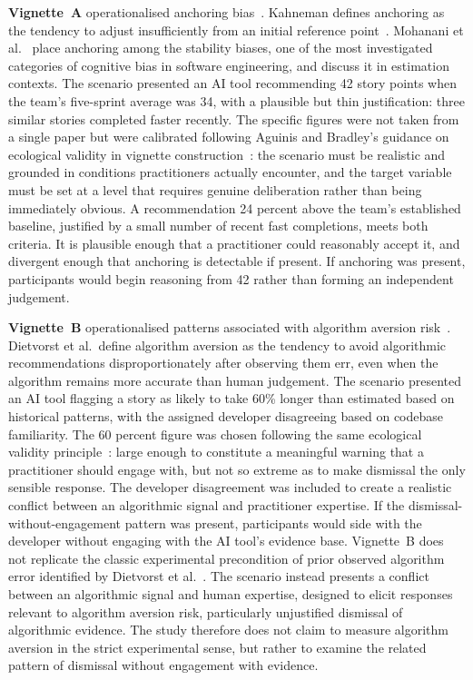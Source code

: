 \documentclass[a4paper,twoside]{bth}
\begin{document}
\textbf{Vignette~A} operationalised anchoring bias~\cite{mohanani2018cognitive, kahneman2011thinking}. Kahneman defines anchoring as the tendency to adjust insufficiently from an initial reference point~\cite[pp.~119--128]{kahneman2011thinking}. Mohanani et al.~\cite{mohanani2018cognitive} place anchoring among the stability biases, one of the most investigated categories of cognitive bias in software engineering, and discuss it in estimation contexts. The scenario presented an AI tool recommending 42 story points when the team's five-sprint average was 34, with a plausible but thin justification: three similar stories completed faster recently. The specific figures were not taken from a single paper but were calibrated following Aguinis and Bradley's guidance on ecological validity in vignette construction~\cite{aguinis2014best}: the scenario must be realistic and grounded in conditions practitioners actually encounter, and the target variable must be set at a level that requires genuine deliberation rather than being immediately obvious. A recommendation 24 percent above the team's established baseline, justified by a small number of recent fast completions, meets both criteria. It is plausible enough that a practitioner could reasonably accept it, and divergent enough that anchoring is detectable if present. If anchoring was present, participants would begin reasoning from 42 rather than forming an independent judgement.

\textbf{Vignette~B} operationalised patterns associated with algorithm aversion risk~\cite{dietvorst2015algorithm}. Dietvorst et al.\ define algorithm aversion as the tendency to avoid algorithmic recommendations disproportionately after observing them err, even when the algorithm remains more accurate than human judgement. The scenario presented an AI tool flagging a story as likely to take 60\% longer than estimated based on historical patterns, with the assigned developer disagreeing based on codebase familiarity. The 60 percent figure was chosen following the same ecological validity principle~\cite{aguinis2014best}: large enough to constitute a meaningful warning that a practitioner should engage with, but not so extreme as to make dismissal the only sensible response. The developer disagreement was included to create a realistic conflict between an algorithmic signal and practitioner expertise. If the dismissal-without-engagement pattern was present, participants would side with the developer without engaging with the AI tool's evidence base. Vignette~B does not replicate the classic experimental precondition of prior observed algorithm error identified by Dietvorst et al.~\cite{dietvorst2015algorithm}. The scenario instead presents a conflict between an algorithmic signal and human expertise, designed to elicit responses relevant to algorithm aversion risk, particularly unjustified dismissal of algorithmic evidence. The study therefore does not claim to measure algorithm aversion in the strict experimental sense, but rather to examine the related pattern of dismissal without engagement with evidence.
\end{document}
